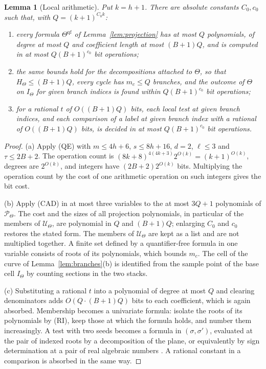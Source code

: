 \documentclass[11pt,a4paper]{article}
\theoremstyle{plain}
\newtheorem{lemma}[theorem]{Lemma}
\theoremstyle{definition}
\theoremstyle{remark}
\begin{document}
\begin{lemma}[Local arithmetic]\label{lem:bits}
Put $k=h+1$. There are absolute constants $C_0,c_0$ such that, with $Q=(k+1)^{C_0k}$:
\begin{enumerate}[label=(\alph*)]
\item every formula $\Theta^{\mathrm{qf}}$ of Lemma~\ref{lem:projection} has at most $Q$ polynomials, of degree at most $Q$ and coefficient length at most $(B+1)Q$, and is computed in at most $Q(B+1)^{c_0}$ bit operations;
\item the same bounds hold for the decompositions attached to $\Theta$, so that $H_\Theta\le(B+1)Q$, every cycle has $m_c\le Q$ branches, and the outcome of $\Theta$ on $I_\Theta$ for given branch indices is found within $Q(B+1)^{c_0}$ bit operations;
\item for a rational $t$ of $O((B+1)Q)$ bits, each local test at given branch indices, and each comparison of a label at given branch index with a rational of $O((B+1)Q)$ bits, is decided in at most $Q(B+1)^{c_0}$ bit operations.
\end{enumerate}
\end{lemma}
\begin{proof}
(a) Apply (QE) with $m\le4h+6$, $s\le8h+16$, $d=2$, $\ell\le3$ and $\tau\le2B+2$. The operation count is $(8k+8)^{4(4k+3)}2^{O(k)}=(k+1)^{O(k)}$, degrees are $2^{O(k)}$, and integers have $(2B+2)2^{O(k)}$ bits. Multiplying the operation count by the cost of one arithmetic operation on such integers gives the bit cost.

(b) Apply (CAD) in at most three variables to the at most $3Q+1$ polynomials of $\mathcal{P}_\Theta$. The cost and the sizes of all projection polynomials, in particular of the members of $\mathcal{U}_\Theta$, are polynomial in $Q$ and $(B+1)Q$; enlarging $C_0$ and $c_0$ restores the stated form. The members of $\mathcal{U}_\Theta$ are kept as a list and are not multiplied together. A finite set defined by a quantifier-free formula in one variable consists of roots of its polynomials, which bounds $m_c$. The cell of the curve of Lemma~\ref{lem:branches}(b) is identified from the sample point of the base cell $I_\Theta$ by counting sections in the two stacks.

(c) Substituting a rational $t$ into a polynomial of degree at most $Q$ and clearing denominators adds $O(Q\cdot(B+1)Q)$ bits to each coefficient, which is again absorbed. Membership becomes a univariate formula: isolate the roots of its polynomials by (RI), keep those at which the formula holds, and number them increasingly. A test with two seeds becomes a formula in $(\sigma,\sigma')$, evaluated at the pair of indexed roots by a decomposition of the plane, or equivalently by sign determination at a pair of real algebraic numbers \citep[Chapters 10--11]{bpr2006}. A rational constant in a comparison is absorbed in the same way.
\end{proof}
\end{document}

